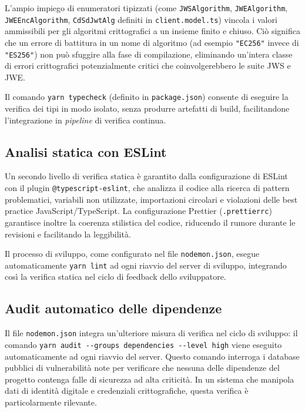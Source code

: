 L'ampio impiego di enumeratori tipizzati (come \texttt{JWSAlgorithm}, \texttt{JWEAlgorithm}, \texttt{JWEEncAlgorithm}, \texttt{CdSdJwtAlg} definiti in \texttt{client.model.ts}) vincola i valori ammissibili per gli algoritmi crittografici a un insieme finito e chiuso. Ciò significa che un errore di battitura in un nome di algoritmo (ad esempio \texttt{"EC256"} invece di \texttt{"ES256"}) non può sfuggire alla fase di compilazione, eliminando un'intera classe di errori crittografici potenzialmente critici che coinvolgerebbero le suite JWS e JWE.

Il comando \texttt{yarn typecheck} (definito in \texttt{package.json}) consente di eseguire la verifica dei tipi in modo isolato, senza produrre artefatti di build, facilitandone l'integrazione in \textit{pipeline} di verifica continua.

\subsection{Analisi statica con ESLint}
Un secondo livello di verifica statica è garantito dalla configurazione di ESLint con il plugin \texttt{@typescript-\allowbreak{}eslint}, che analizza il codice alla ricerca di pattern problematici, variabili non utilizzate, importazioni circolari e violazioni delle best practice JavaScript/TypeScript. La configurazione Prettier (\texttt{.prettierrc}) garantisce inoltre la coerenza stilistica del codice, riducendo il rumore durante le revisioni e facilitando la leggibilità.

Il processo di sviluppo, come configurato nel file \texttt{nodemon.json}, esegue automaticamente \texttt{yarn lint} ad ogni riavvio del server di sviluppo, integrando così la verifica statica nel ciclo di feedback dello sviluppatore.

\subsection{Audit automatico delle dipendenze}
Il file \texttt{nodemon.json} integra un'ulteriore misura di verifica nel ciclo di sviluppo: il comando \texttt{yarn audit -\allowbreak{}-\allowbreak{}groups dependencies -\allowbreak{}-\allowbreak{}level high} viene eseguito automaticamente ad ogni riavvio del server. Questo comando interroga i database pubblici di vulnerabilità note per verificare che nessuna delle dipendenze del progetto contenga falle di sicurezza ad alta criticità. In un sistema che manipola dati di identità digitale e credenziali crittografiche, questa verifica è particolarmente rilevante.

